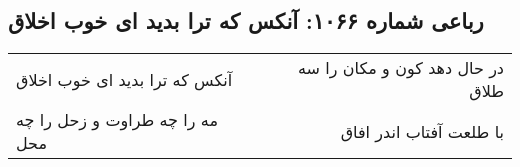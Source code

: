 \begin{center}
\section*{رباعی شماره ۱۰۶۶: آنکس که ترا بدید ای خوب اخلاق}
\label{sec:1066}
\begin{longtable}{l p{0.5cm} r}
آنکس که ترا بدید ای خوب اخلاق
&&
در حال دهد کون و مکان را سه طلاق
\\
مه را چه طراوت و زحل را چه محل
&&
با طلعت آفتاب اندر افاق
\\
\end{longtable}
\end{center}
